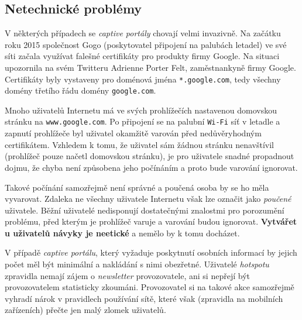 \documentclass[thesis=M,czech]{FITthesis}[2012/10/20]
\begin{document}
% 





\subsection{Netechnické problémy}
\label{subsec:netechnicke-problemy}

V některých případech se \textit{captive portály} chovají velmi invazivně. Na začátku roku 2015 společnost Gogo (poskytovatel připojení na palubách letadel) ve své síti začala využívat falešné certifikáty pro produkty firmy Google. Na situaci upozornila na svém Twitteru\cite{gogo-fakecerts} Adrienne Porter Felt, zaměstnankyně firmy Google. Certifikáty byly vystaveny pro doménová jména \texttt{*.google.com}, tedy všechny domény třetího řádu domény \texttt{google.com}.

Mnoho uživatelů Internetu má ve svých prohlížečích nastavenou domovskou stránku na \texttt{www.google.com}. Po připojení se na palubní \texttt{Wi-Fi} síť v letadle a zapnutí prohlížeče byl uživatel okamžitě varován před nedůvěryhodným certifikátem. Vzhledem k tomu, že uživatel sám žádnou stránku nenavštívil (prohlížeč pouze načetl domovskou stránku), je pro uživatele snadné propadnout dojmu, že chyba není způsobena jeho počínáním a proto bude varování ignorovat.

Takové počínání samozřejmě není správné a poučená osoba by se ho měla vyvarovat. Zdaleka ne všechny uživatele Internetu však lze označit jako \textit{poučené} uživatele. Běžní uživatelé nedisponují dostatečnými znalostmi pro porozumění problému, před kterým je prohlížeč varuje a varování budou ignorovat. \textbf{Vytvářet u uživatelů návyky  je neetické} a nemělo by k tomu docházet.

V případě \textit{captive portálu}, který vyžaduje poskytnutí osobních informací by jejich počet měl být minimální a nakládání s nimi obezřetné. Uživatelé \textit{hotspotu} zpravidla nemají zájem o \textit{newsletter} provozovatele, ani si nepřejí být provozovatelem statisticky zkoumáni. Provozovatel si na takové akce samozřejmě vyhradí nárok v pravidlech používání sítě, které však (zpravidla na mobilních zařízeních) přečte jen malý zlomek uživatelů.
\end{document}
